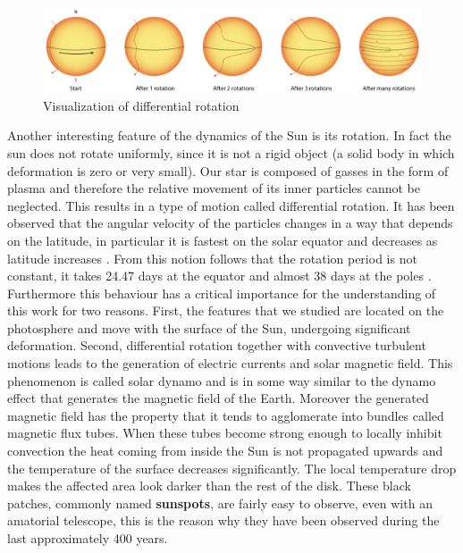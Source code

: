 \begin{figure}[b]
    \centering
    \includegraphics[width=\textwidth]{./pictures/diffrot}
    \caption{Visualization of differential rotation}
    \label{fig:diffrot}
\end{figure}
Another interesting feature of the dynamics of the Sun is its rotation. In fact the sun does not rotate uniformly, since it is not a rigid object (a solid body in which deformation is zero or very small). Our star is composed of gasses in the form of plasma and therefore the relative movement of its inner particles cannot be neglected. This results in a type of motion called differential rotation. It has been observed that the angular velocity of the particles changes in a way that depends on the latitude, in particular it is fastest on the solar equator and decreases as latitude increases \cite{diffrot}. From this notion follows that the rotation period is not constant, it takes 24.47 days at the equator and almost 38 days at the poles \cite{diffrotrev}. Furthermore this behaviour has a critical importance for the understanding of this work for two reasons. First, the features that we studied are located on the photosphere and move with the surface of the Sun, undergoing significant deformation. Second, differential rotation together with convective turbulent motions leads to the generation of electric currents and solar magnetic field. This phenomenon is called solar dynamo and is in some way similar to the dynamo effect that generates the magnetic field of the Earth. Moreover the generated magnetic field has the property that it tends to agglomerate into bundles called magnetic flux tubes. When these tubes become strong enough to locally inhibit convection the heat coming from inside the Sun is not propagated upwards and the temperature of the surface decreases significantly. The local temperature drop makes the affected area look darker than the rest of the disk. These black patches, commonly named \textbf{sunspots}, are fairly easy to observe, even with an amatorial telescope, this is the reason why they have been observed during the last approximately 400 years.
